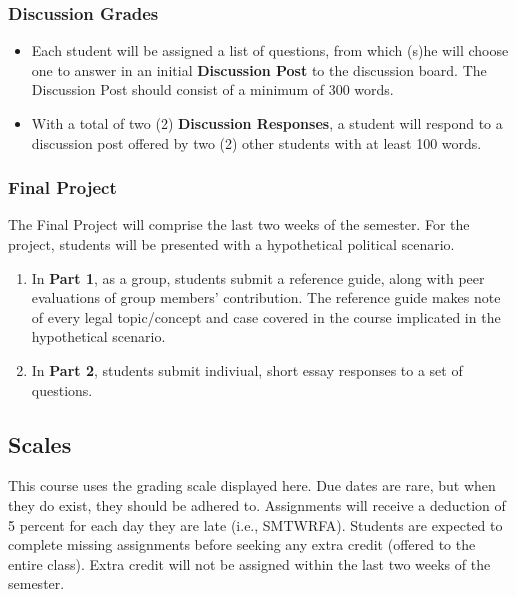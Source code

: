 \documentclass[10pt,]{article}
\providecommand{\tightlist}{%
  \setlength{\itemsep}{0pt}\setlength{\parskip}{0pt}}
\begin{document}
\hypertarget{discussion-grades}{%
\subsubsection{Discussion Grades}\label{discussion-grades}}

\begin{itemize}
\tightlist
\item
  Each student will be assigned a list of questions, from which (s)he
  will choose one to answer in an initial \textbf{Discussion Post} to
  the discussion board. The Discussion Post should consist of a minimum
  of 300 words.
\item
  With a total of two (2) \textbf{Discussion Responses}, a student will
  respond to a discussion post offered by two (2) other students with at
  least 100 words.
\end{itemize}

\hypertarget{final-project}{%
\subsubsection{Final Project}\label{final-project}}

The Final Project will comprise the last two weeks of the semester. For
the project, students will be presented with a hypothetical political
scenario.

\begin{enumerate}
\def\labelenumi{\arabic{enumi}.}
\tightlist
\item
  In \textbf{Part 1}, as a group, students submit a reference guide,
  along with peer evaluations of group members' contribution. The
  reference guide makes note of every legal topic/concept and case
  covered in the course implicated in the hypothetical scenario.
\item
  In \textbf{Part 2}, students submit indiviual, short essay responses
  to a set of questions.
\end{enumerate}

\hypertarget{scales}{%
\subsection{Scales}\label{scales}}

This course uses the grading scale displayed here. Due dates are rare,
but when they do exist, they should be adhered to. Assignments will
receive a deduction of 5 percent for each day they are late (i.e.,
SMTWRFA). Students are expected to complete missing assignments before
seeking any extra credit (offered to the entire class). Extra credit
will not be assigned within the last two weeks of the semester.
\end{document}
